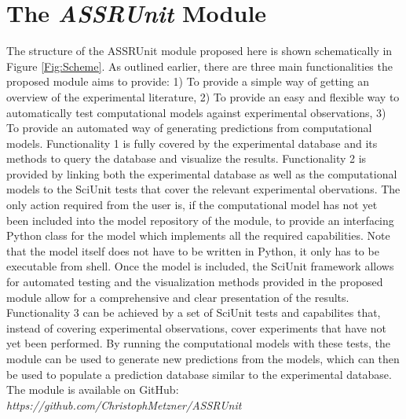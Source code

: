 \documentclass[CompPsych]{stjour}
\begin{document}
\section{The \textit{ASSRUnit} Module}
The structure of the ASSRUnit module proposed here is shown schematically in Figure \ref{Fig:Scheme}. As outlined earlier, there are three main functionalities the proposed module aims to provide: 1) To provide a simple way of getting an overview
of the experimental literature, 2) To provide an easy and flexible way to automatically test computational models against experimental observations, 3) To provide an automated way of generating predictions from computational
models. Functionality 1 is fully covered by the experimental database and its methods to query the database and visualize the results. Functionality 2 is provided by linking both the experimental database as well as the 
computational models to the SciUnit tests that cover the relevant experimental obervations. The only action required from the user is, if the computational model has not yet been included into the model repository of the module, 
to provide an interfacing Python class for the model which implements all the required capabilities. Note that the model itself does not have to be written in Python, it only has to be executable from shell. Once the model is
included, the SciUnit framework allows for automated testing and the visualization methods provided in the proposed module allow for a comprehensive and clear presentation of the results. Functionality 3 can be achieved by
a set of SciUnit tests and capabilites that, instead of covering experimental observations, cover experiments that have not yet been performed. By running the computational models with these tests, 
the module can be used to generate new predictions from the models, which can then be used to populate a prediction database similar to the experimental database. The module is available on GitHub: 
\textit{https://github.com/ChristophMetzner/ASSRUnit}
\end{document}
